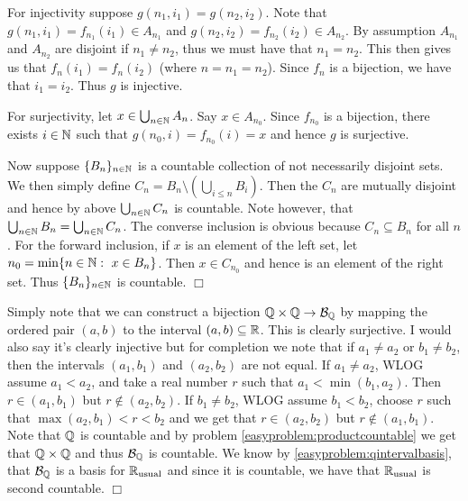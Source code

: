 \documentclass{article}
\begin{document}
 {
    For injectivity suppose $g(n_{1}, i_{1}) = g(n_{2}, i_{2})$. Note that $g(n_{1}, i_{1}) = f_{n_{1}}(i_{1})\in A_{n_{1}}$ and $g(n_{2}, i_{2}) = f_{n_{2}}(i_{2})\in A_{n_{2}}$. By assumption $A_{n_{1}}$ and $A_{n_{2}}$ are disjoint if $n_{1}\neq n_{2}$, thus we must have that $n_{1} = n_{2}$. This then gives us that $f_{n}(i_{1}) = f_{n}(i_{2})$ (where $n = n_{1} = n_{2}$). Since $f_{n}$ is a bijection, we have that $i_{1} = i_{2}$. Thus $g$ is injective. 

    For surjectivity, let $x\in \bigcup_{n\in \mathbb{N}} A_{n}$. Say $x \in A_{n_{0}}$. Since $f_{n_{0}}$ is a bijection, there exists $i\in \mathbb{N}$ such that $g(n_{0}, i) = f_{n_{0}}(i) = x$ and hence $g$ is surjective.

    Now suppose $\{B_{n}\}_{n\in \mathbb{N}}$ is a countable collection of not necessarily disjoint sets. We then simply define $C_{n} = B_{n} \setminus\left(\bigcup_{i\leq n} B_{i}\right)$. Then the $C_{n}$ are mutually disjoint and hence by above $\bigcup_{n\in \mathbb{N}}C_{n}$ is countable. Note however, that $\bigcup_{n\in \mathbb{N}} B_{n} = \bigcup_{n\in \mathbb{N}}C_{n}$. The converse inclusion is obvious because $C_{n}\subseteq B_{n}$ for all $n$. For the forward inclusion, if $x$ is an element of the left set, let $n_{0} = \min\{n\in \mathbb{N}:\ x\in B_{n}\}$. Then $x\in C_{n_{0}}$ and hence is an element of the right set. Thus $\{B_{n}\}_{n\in \mathbb{N}}$ is countable. $\Box$
}

 {
    Simply note that we can construct a bijection $\mathbb{Q}\times \mathbb{Q}\to \mathcal{B}_{\mathbb{Q}}$ by mapping the ordered pair $(a,b)$ to the interval $(a,b)\subseteq \mathbb{R}$. This is clearly surjective. I would also say it's clearly injective but for completion we note that if $a_{1}\neq a_{2}$ or $b_{1}\neq b_{2}$, then the intervals $(a_{1}, b_{1})$ and $(a_{2}, b_{2})$ are not equal. If $a_{1} \neq a_{2}$, WLOG assume $a_{1} < a_{2}$, and take a real number $r$ such that $a_{1} < \min(b_{1}, a_{2})$. Then $r\in (a_{1}, b_{1})$ but $r\not\in (a_{2}, b_{2})$. If $b_{1}\neq b_{2}$, WLOG assume $b_{1}  < b_{2}$, choose $r$ such that $\max(a_{2}, b_{1}) < r < b_{2}$ and we get that $r\in (a_{2}, b_{2})$ but $r\not\in (a_{1}, b_{1})$. Note that $\mathbb{Q}$ is countable and by problem \ref{easyproblem:productcountable} we get that $\mathbb{Q}\times \mathbb{Q}$ and thus $\mathcal{B}_{\mathbb{Q}}$ is countable. We know by \ref{easyproblem:qintervalbasis}, that $\mathcal{B}_{\mathbb{Q}}$ is a basis for $\mathbb{R}_{\text{usual}}$ and since it is countable, we have that $\mathbb{R}_{\text{usual}}$ is second countable. $\Box$
}
\end{document}
